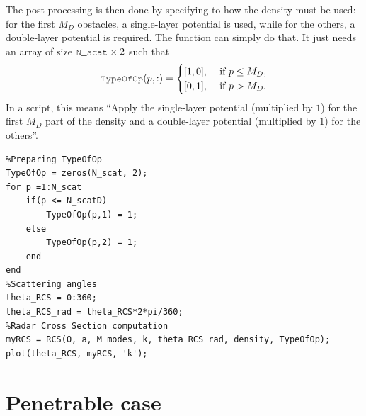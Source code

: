 The post-processing is then done by specifying to \mudiff how the density must be used: for the first $M_D$ obstacles, a single-layer potential is used,
while for the others, a double-layer potential is required. The \RCS function can simply do that. It just needs an array  of size
 $\code{N\_scat}\times 2$ such that
$$
\code{TypeOfOp}(p,:) = \begin{cases}
[1,0], &\text{ if } p \leq M_D,\\
[0,1], &\text{ if } p > M_D.
\end{cases}
$$
In a \mudiff script, this  means ``Apply the single-layer potential (multiplied by $1$) for the first $M_D$ part of the density and a double-layer potential
 (multiplied by $1$) for the others''.
\begin{lstlisting}
%Preparing TypeOfOp
TypeOfOp = zeros(N_scat, 2);
for p =1:N_scat
	if(p <= N_scatD)
		TypeOfOp(p,1) = 1;
	else
		TypeOfOp(p,2) = 1;
	end
end
%Scattering angles
theta_RCS = 0:360;
theta_RCS_rad = theta_RCS*2*pi/360;
%Radar Cross Section computation
myRCS = RCS(O, a, M_modes, k, theta_RCS_rad, density, TypeOfOp);
plot(theta_RCS, myRCS, 'k');
\end{lstlisting}


\newpage
\section{Penetrable case}

